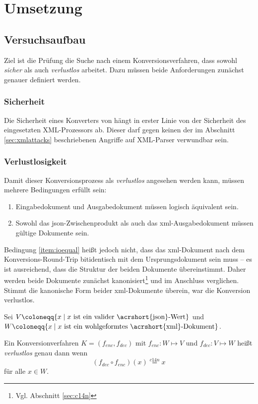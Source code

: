 \chapter{Umsetzung}
\label{chap:impl}
\section{Versuchsaufbau}

Ziel ist die Prüfung die Suche nach einem Konversionsverfahren, dass sowohl \emph{sicher} als auch \emph{verlustlos} arbeitet. Dazu müssen beide Anforderungen zunächst genauer definiert werden.

\subsection{Sicherheit}

Die Sicherheit eines Konverters von hängt in erster Linie von der Sicherheit des eingesetzten XML-Prozessors ab. Dieser darf gegen keinen der im Abschnitt \ref{sec:xmlattacks} beschriebenen Angriffe auf XML-Parser verwundbar sein.


\subsection{Verlustlosigkeit}

Damit dieser Konversionsprozess als \emph{verlustlos} angesehen werden kann, müssen mehrere Bedingungen erfüllt sein:
\begin{enumerate}
    \item{} Eingabedokument und Ausgabedokument müssen logisch äquivalent sein.\label{item:ioequal}
    \item{} Sowohl das \acrshort{json}-Zwischenprodukt als auch das \acrshort{xml}-Ausgabedokument müssen gültige Dokumente sein.\label{item:outputwellf}
\end{enumerate}

Bedingung \ref{item:ioequal} heißt jedoch nicht, dass das \acrshort{xml}-Dokument nach dem Konversions-Round-Trip bitidentisch mit dem Ursprungsdokument sein muss -- es ist ausreichend, dass die Struktur der beiden Dokumente übereinstimmt. Daher werden beide Dokumente zunächst kanonisiert\footnote{Vgl. Abschnitt \ref{sec:c14n}} und im Anschluss verglichen. Stimmt die kanonische Form beider \acrshort{xml}-Dokumente überein, war die Konversion verlustlos.

\begin{definition}
    Sei $V \coloneqq \{x \mid x\text{ ist ein valider }\allowbreak{}\text{\acrshort{json}-Wert}\}$ und $W \coloneqq \{x \mid x\text{ ist ein wohlgeformtes \acrshort{xml}-Dokument}\}$.

    Ein Konversionverfahren $K = (f_{enc}, f_{dec})$ mit $f_{enc}: W \mapsto V$ und $f_{dec}: V \mapsto W$ heißt \emph{verlustlos} genau dann wenn
    \begin{equation}
        (f_{dec}\mathrel{\circ} f_{enc})(x) \mathbin{\stackrel{c14n}{=}} x
    \end{equation}
    für alle $x \in W$.
\end{definition}

